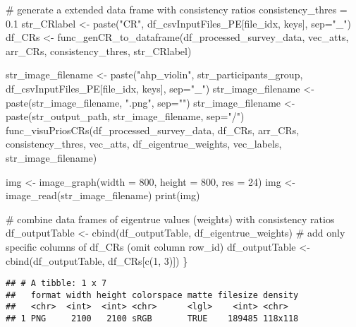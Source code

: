 \documentclass[
]{article}
\newenvironment{Shaded}{\begin{snugshade}}{\end{snugshade}}
\newcommand{\AttributeTok}[1]{\textcolor[rgb]{0.00,0.34,0.68}{#1}}
\newcommand{\CommentTok}[1]{\textcolor[rgb]{0.54,0.53,0.53}{#1}}
\newcommand{\DecValTok}[1]{\textcolor[rgb]{0.69,0.50,0.00}{#1}}
\newcommand{\FloatTok}[1]{\textcolor[rgb]{0.69,0.50,0.00}{#1}}
\newcommand{\FunctionTok}[1]{\textcolor[rgb]{0.39,0.29,0.61}{#1}}
\newcommand{\NormalTok}[1]{\textcolor[rgb]{0.12,0.11,0.11}{#1}}
\newcommand{\OtherTok}[1]{\textcolor[rgb]{0.00,0.43,0.16}{#1}}
\newcommand{\StringTok}[1]{\textcolor[rgb]{0.75,0.01,0.01}{#1}}
\begin{document}
\begin{Shaded}
\begin{Highlighting}[]
  \CommentTok{\# generate a extended data frame with consistency ratios}
\NormalTok{  consistency\_thres }\OtherTok{=} \FloatTok{0.1}
\NormalTok{  str\_CRlabel }\OtherTok{\textless{}{-}} \FunctionTok{paste}\NormalTok{(}\StringTok{"CR"}\NormalTok{, df\_csvInputFiles\_PE[file\_idx, keys], }\AttributeTok{sep=}\StringTok{"\_"}\NormalTok{)}
\NormalTok{  df\_CRs }\OtherTok{\textless{}{-}} \FunctionTok{func\_genCR\_to\_dataframe}\NormalTok{(df\_processed\_survey\_data, vec\_atts, arr\_CRs, consistency\_thres, str\_CRlabel)}
  
\NormalTok{  str\_image\_filename }\OtherTok{\textless{}{-}} \FunctionTok{paste}\NormalTok{(}\StringTok{"ahp\_violin"}\NormalTok{, str\_participants\_group, df\_csvInputFiles\_PE[file\_idx, keys], }\AttributeTok{sep=}\StringTok{"\_"}\NormalTok{)}
\NormalTok{  str\_image\_filename }\OtherTok{\textless{}{-}} \FunctionTok{paste}\NormalTok{(str\_image\_filename, }\StringTok{".png"}\NormalTok{, }\AttributeTok{sep=}\StringTok{""}\NormalTok{)}
\NormalTok{  str\_image\_filename }\OtherTok{\textless{}{-}} \FunctionTok{paste}\NormalTok{(str\_output\_path, str\_image\_filename, }\AttributeTok{sep=}\StringTok{"/"}\NormalTok{)}
  \FunctionTok{func\_visuPriosCRs}\NormalTok{(df\_processed\_survey\_data, df\_CRs, arr\_CRs, consistency\_thres, vec\_atts, df\_eigentrue\_weights, vec\_labels, str\_image\_filename)}
  
\NormalTok{  img }\OtherTok{\textless{}{-}} \FunctionTok{image\_graph}\NormalTok{(}\AttributeTok{width =} \DecValTok{800}\NormalTok{, }\AttributeTok{height =} \DecValTok{800}\NormalTok{, }\AttributeTok{res =} \DecValTok{24}\NormalTok{)}
\NormalTok{  img }\OtherTok{\textless{}{-}} \FunctionTok{image\_read}\NormalTok{(str\_image\_filename)}
  \FunctionTok{print}\NormalTok{(img)}
  
  \CommentTok{\# combine data frames of eigentrue values (weights) with consistency ratios}
\NormalTok{  df\_outputTable }\OtherTok{\textless{}{-}} \FunctionTok{cbind}\NormalTok{(df\_outputTable, df\_eigentrue\_weights)}
  \CommentTok{\# add only specific columns of \textquotesingle{}df\_CRs\textquotesingle{} (omit column \textquotesingle{}row\_id\textquotesingle{})}
\NormalTok{  df\_outputTable }\OtherTok{\textless{}{-}} \FunctionTok{cbind}\NormalTok{(df\_outputTable, df\_CRs[}\FunctionTok{c}\NormalTok{(}\DecValTok{1}\NormalTok{, }\DecValTok{3}\NormalTok{)])}
\NormalTok{\}}
\end{Highlighting}
\end{Shaded}

\begin{verbatim}
## # A tibble: 1 x 7
##   format width height colorspace matte filesize density
##   <chr>  <int>  <int> <chr>      <lgl>    <int> <chr>  
## 1 PNG     2100   2100 sRGB       TRUE    189485 118x118
\end{verbatim}
\end{document}
